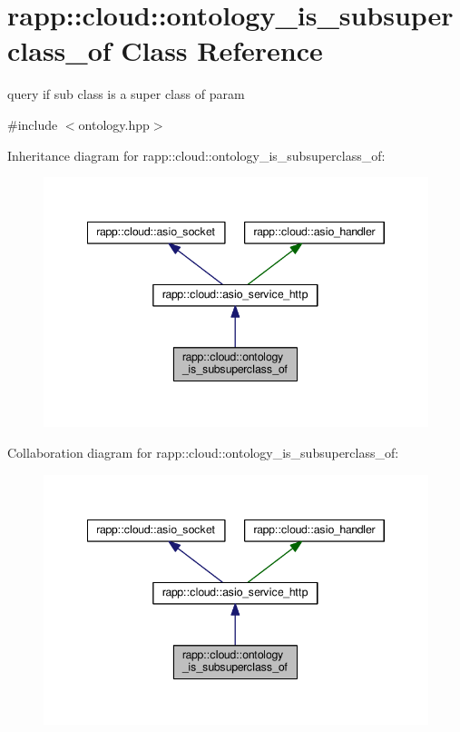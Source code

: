 \hypertarget{classrapp_1_1cloud_1_1ontology__is__subsuperclass__of}{\section{rapp\-:\-:cloud\-:\-:ontology\-\_\-is\-\_\-subsuperclass\-\_\-of Class Reference}
\label{classrapp_1_1cloud_1_1ontology__is__subsuperclass__of}
}


query if sub class is a super class of param  




{\ttfamily \#include $<$ontology.\-hpp$>$}



Inheritance diagram for rapp\-:\-:cloud\-:\-:ontology\-\_\-is\-\_\-subsuperclass\-\_\-of\-:
\nopagebreak
\begin{figure}[H]
\begin{center}
\leavevmode
\includegraphics[width=345pt]{classrapp_1_1cloud_1_1ontology__is__subsuperclass__of__inherit__graph}
\end{center}
\end{figure}


Collaboration diagram for rapp\-:\-:cloud\-:\-:ontology\-\_\-is\-\_\-subsuperclass\-\_\-of\-:
\nopagebreak
\begin{figure}[H]
\begin{center}
\leavevmode
\includegraphics[width=345pt]{classrapp_1_1cloud_1_1ontology__is__subsuperclass__of__coll__graph}
\end{center}
\end{figure}
